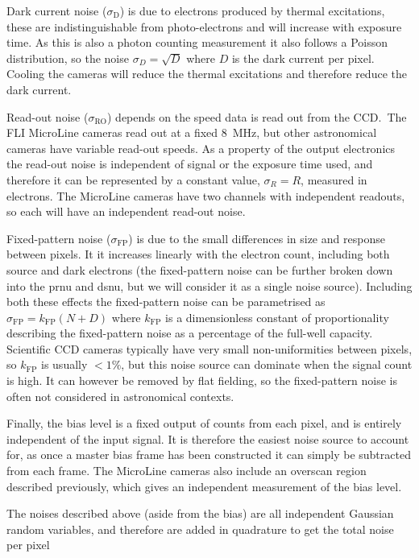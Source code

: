 \begin{colsection}
\begin{colsection}
Dark current noise ($\sigma_\text{D}$) is due to electrons produced by thermal excitations, these are indistinguishable from photo-electrons and will increase with exposure time. As this is also a photon counting measurement it also follows a Poisson distribution, so the noise $\sigma_D = \sqrt{D}$ where $D$ is the dark current per pixel. Cooling the cameras will reduce the thermal excitations and therefore reduce the dark current.

Read-out noise ($\sigma_\text{RO}$) depends on the speed data is read out from the CCD.\ The FLI MicroLine cameras read out at a fixed \SI{8}{\mega\hertz}, but other astronomical cameras have variable read-out speeds. As a property of the output electronics the read-out noise is independent of signal or the exposure time used, and therefore it can be represented by a constant value, $\sigma_R = R$, measured in electrons. The MicroLine cameras have two channels with independent readouts, so each will have an independent read-out noise.

Fixed-pattern noise ($\sigma_\text{FP}$) is due to the small differences in size and response between pixels. It it increases linearly with the electron count, including both source and dark electrons (the fixed-pattern noise can be further broken down into the \gls{prnu} and \gls{dsnu}, but we will consider it as a single noise source). Including both these effects the fixed-pattern noise can be parametrised as $\sigma_\text{FP} = k_\text{FP}(N+D)$ where $k_\text{FP}$ is a dimensionless constant of proportionality describing the fixed-pattern noise as a percentage of the full-well capacity. Scientific CCD cameras typically have very small non-uniformities between pixels, so $k_\text{FP}$ is usually $<1\%$, but this noise source can dominate when the signal count is high. It can however be removed by flat fielding, so the fixed-pattern noise is often not considered in astronomical contexts.

Finally, the bias level is a fixed output of counts from each pixel, and is entirely independent of the input signal. It is therefore the easiest noise source to account for, as once a master bias frame has been constructed it can simply be subtracted from each frame. The MicroLine cameras also include an overscan region described previously, which gives an independent measurement of the bias level.

The noises described above (aside from the bias) are all independent Gaussian random variables, and therefore are added in quadrature to get the total noise per pixel


\end{colsection}
\end{colsection}
